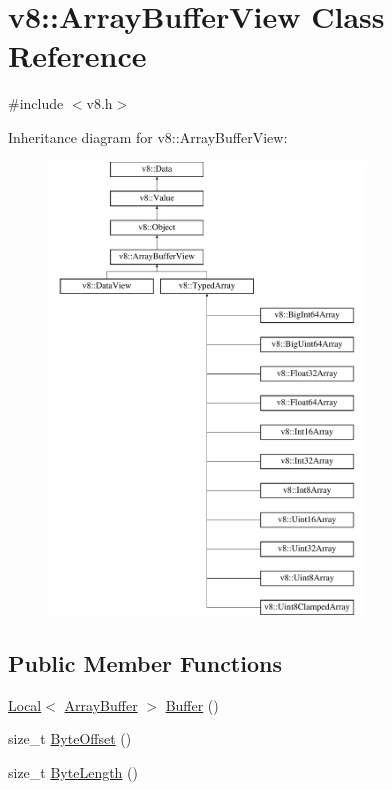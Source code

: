 \hypertarget{classv8_1_1ArrayBufferView}{\section{v8\-:\-:Array\-Buffer\-View Class Reference}
\label{classv8_1_1ArrayBufferView}
}


{\ttfamily \#include $<$v8.\-h$>$}

Inheritance diagram for v8\-:\-:Array\-Buffer\-View\-:\begin{figure}[H]
\begin{center}
\leavevmode
\includegraphics[height=12.000000cm]{classv8_1_1ArrayBufferView}
\end{center}
\end{figure}
\subsection*{Public Member Functions}
\begin{DoxyCompactItemize}
\item 
\hyperlink{classv8_1_1Local}{Local}$<$ \hyperlink{classv8_1_1ArrayBuffer}{Array\-Buffer} $>$ \hyperlink{classv8_1_1ArrayBufferView_a2ceba3908fbf98ecc81702083127b046}{Buffer} ()
\item 
size\-\_\-t \hyperlink{classv8_1_1ArrayBufferView_a4739a31269f5ebc5b88a708b9429c688}{Byte\-Offset} ()
\item 
size\-\_\-t \hyperlink{classv8_1_1ArrayBufferView_a9fc7563c97e0b639a6c0a3274995bb3c}{Byte\-Length} ()
\end{DoxyCompactItemize}
